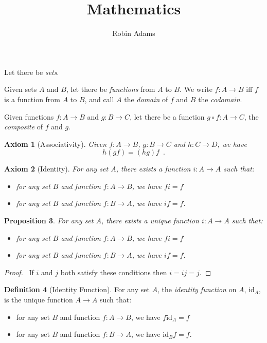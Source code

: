 \documentclass{book}
\title{Mathematics}
\author{Robin Adams}
\let\qed\relax
\newtheorem{ax}{Axiom}[chapter]
\newtheorem{prop}[ax]{Proposition}
\theoremstyle{definition}
\newtheorem{df}[ax]{Definition}
\begin{document}
\maketitle
\tableofcontents

Let there be \emph{sets}.

Given sets $A$ and $B$, let there be \emph{functions} from $A$ to $B$. We write $f : A \rightarrow B$ iff $f$ is a function from $A$ to $B$, and call $A$ the \emph{domain} of $f$ and $B$ the \emph{codomain}.

Given functions $f : A \rightarrow B$ and $g : B \rightarrow C$, let there be a function $g \circ f : A \rightarrow C$, the \emph{composite} of $f$ and $g$.

\begin{ax}[Associativity]
Given $f : A \rightarrow B$, $g : B \rightarrow C$ and $h : C \rightarrow D$, we have
\[ h (gf) = (hg) f \enspace . \]
\end{ax}

\begin{ax}[Identity]
For any set $A$, there exists a function $i : A \rightarrow A$ such that:
\begin{itemize}
\item for any set $B$ and function $f : A \rightarrow B$, we have $fi = f$
\item for any set $B$ and function $f : B \rightarrow A$, we have $if = f$.
\end{itemize}
\end{ax}

\begin{prop}
For any set $A$, there exists a unique function $i : A \rightarrow A$ such that:
\begin{itemize}
\item for any set $B$ and function $f : A \rightarrow B$, we have $fi = f$
\item for any set $B$ and function $f : B \rightarrow A$, we have $if = f$.
\end{itemize}
\end{prop}

\begin{proof}
\pf\ If $i$ and $j$ both satisfy these conditions then $i = ij = j$. \qed
\end{proof}

\begin{df}[Identity Function]
For any set $A$, the \emph{identity function} on $A$, $\mathrm{id}_A$, is the unique function $A \rightarrow A$ such that:
\begin{itemize}
\item for any set $B$ and function $f : A \rightarrow B$, we have $f \mathrm{id}_A = f$
\item for any set $B$ and function $f : B \rightarrow A$, we have $\mathrm{id}_B f = f$.
\end{itemize}
\end{df}
\end{document}
